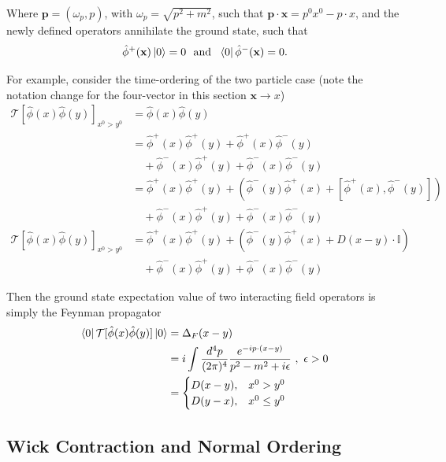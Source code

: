 \noindent Where $\textbf{p} = (\omega_p, p)$, with $\omega_p = \sqrt{p^2 + m^2}$, such that $\textbf{p}\cdot\textbf{x} = p^0x^0 - p\cdot x$, and the newly defined operators annihilate the ground state, such that 
\begin{equation} 
\hat{\phi}^+(\textbf{x})\ket{0} = 0 \,\,\,\, \text{and} \,\,\,\, \bra{0}\hat{\phi}^-(\textbf{x}) = 0. 
\end{equation}

\noindent For example, consider the time-ordering of the two particle case (note the notation change for the four-vector in this section $\textbf{x} \rightarrow x$)
\begin{align*}
\mathcal{T}[\hat{\phi}(x)\hat{\phi}(y)]_{x^0>y^0} &= \hat{\phi}(x)\hat{\phi}(y) \\
&= \hat{\phi}^+(x)\hat{\phi}^+(y) + \hat{\phi}^+(x)\hat{\phi}^-(y) \\
&\,\,\,\,\,\, + \hat{\phi}^-(x)\hat{\phi}^+(y) + \hat{\phi}^-(x)\hat{\phi}^-(y) \\
&= \hat{\phi}^+(x)\hat{\phi}^+(y) + \left(\hat{\phi}^-(y)\hat{\phi}^+(x) + [\hat{\phi}^+(x), \hat{\phi}^-(y)]\right) \\
&\,\,\,\,\,\, + \hat{\phi}^-(x)\hat{\phi}^+(y) + \hat{\phi}^-(x)\hat{\phi}^-(y)  \\ 
\mathcal{T}[\hat{\phi}(x)\hat{\phi}(y)]_{x^0>y^0} &= \hat{\phi}^+(x)\hat{\phi}^+(y) + \left(\hat{\phi}^-(y)\hat{\phi}^+(x) + D(x-y)\cdot\mathbb{I}\right) \\
&\,\,\,\,\,\, + \hat{\phi}^-(x)\hat{\phi}^+(y) + \hat{\phi}^-(x)\hat{\phi}^-(y) 
\end{align*}

\noindent Then the ground state expectation value of two interacting field operators is simply the Feynman propagator
\begin{align}
\bra{0} \mathcal{T}[\hat{\phi}(x)\hat{\phi}(y)] \ket{0} &= \Delta_F(x-y) \\
&= i \int \frac{d^4 p}{(2\pi)^4} \frac{e^{-i p\cdot(x-y)}}{p^2 - m^2 + i\epsilon} \,\, , \,\, \epsilon>0 \\
&=
	\begin{cases}
      		D(x-y), & x^0 > y^0 \\
      		D(y-x), & x^0 \le y^0
    	\end{cases}
\end{align}

\subsection*{Wick Contraction and Normal Ordering}

